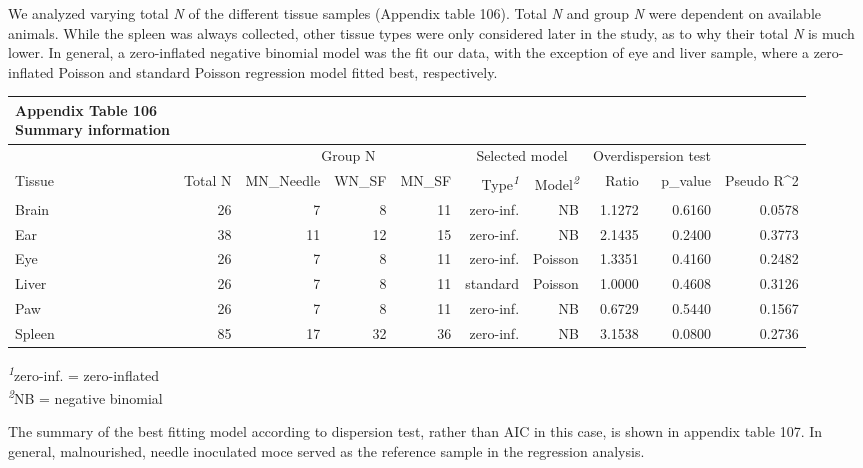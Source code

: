 \documentclass[
  12pt,
  letterpaper,
]{article}
\begin{document}
We analyzed varying total \emph{N} of the different tissue samples (Appendix table 106). Total \emph{N} and group \emph{N} were dependent on available animals. While the spleen was always collected, other tissue types were only considered later in the study, as to why their total \emph{N} is much lower. In general, a zero-inflated negative binomial model was the fit our data, with the exception of eye and liver sample, where a zero-inflated Poisson and standard Poisson regression model fitted best, respectively.

\setlength{\LTpost}{0mm}
\begin{longtable}{l|rrrrrrrrr}
\caption*{
{\large \textbf{Appendix Table 106}} \\ 
{\small \textbf{Summary information}}
} \\ 
\toprule
\multicolumn{1}{l}{} &  & \multicolumn{3}{c}{Group N} & \multicolumn{2}{c}{Selected model} & \multicolumn{2}{c}{Overdispersion test} &  \\ 
\cmidrule(lr){3-5} \cmidrule(lr){6-7} \cmidrule(lr){8-9}
\multicolumn{1}{l}{Tissue} & Total N & MN\_Needle & WN\_SF & MN\_SF & Type\textsuperscript{\textit{1}} & Model\textsuperscript{\textit{2}} & Ratio & p\_value & Pseudo R\textasciicircum{}2 \\ 
\midrule\addlinespace[2.5pt]
Brain & 26 & 7 & 8 & 11 & zero-inf. & NB & 1.1272 & 0.6160 & 0.0578 \\ 
Ear & 38 & 11 & 12 & 15 & zero-inf. & NB & 2.1435 & 0.2400 & 0.3773 \\ 
Eye & 26 & 7 & 8 & 11 & zero-inf. & Poisson & 1.3351 & 0.4160 & 0.2482 \\ 
Liver & 26 & 7 & 8 & 11 & standard & Poisson & 1.0000 & 0.4608 & 0.3126 \\ 
Paw & 26 & 7 & 8 & 11 & zero-inf. & NB & 0.6729 & 0.5440 & 0.1567 \\ 
Spleen & 85 & 17 & 32 & 36 & zero-inf. & NB & 3.1538 & 0.0800 & 0.2736 \\ 
\bottomrule
\end{longtable}
\begin{minipage}{\linewidth}
\textsuperscript{\textit{1}}zero-inf. = zero-inflated\\
\textsuperscript{\textit{2}}NB = negative binomial\\
\end{minipage}

The summary of the best fitting model according to dispersion test, rather than AIC in this case, is shown in appendix table 107. In general, malnourished, needle inoculated moce served as the reference sample in the regression analysis.
\end{document}
